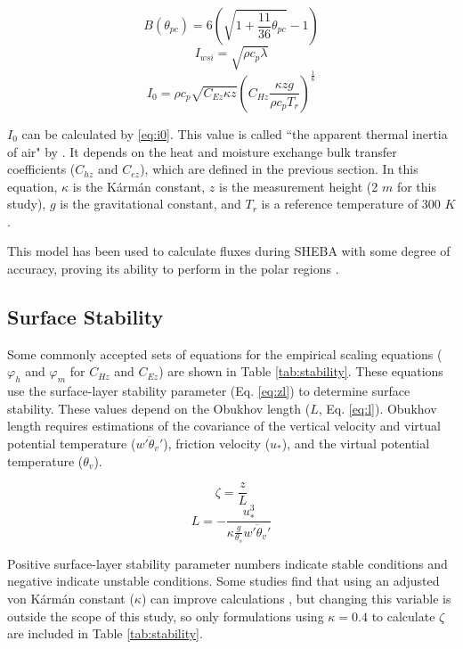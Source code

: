 \begin{equation}\label{eq:mep:b}
B(\theta_{pc}) = 6 \left( \sqrt{1 + \frac{11}{36} \theta_{pc}} - 1 \right)
\end{equation}
\begin{equation}\label{eq:iwsi}
I_{wsi} = \sqrt{\rho c_{p} \lambda}
\end{equation}
\begin{equation}\label{eq:i0}
I_{0} = \rho c_{p} \sqrt{C_{Ez}\kappa z} \left( C_{Hz} \frac{\kappa zg}{\rho c_{p} T_{r}} \right)^{\frac{1}{6}}
\end{equation}

$I_{0}$ can be calculated by \ref{eq:i0}. This value is called ``the apparent thermal inertia of air" by \citet{wang:2009}. It depends on the heat and moisture exchange bulk transfer coefficients ($C_{hz}$ and $C_{ez}$), which are defined in the previous section. In this equation, $\kappa$ is the K\'{a}rm\'{a}n constant, $z$ is the measurement height (2 $m$ for this study), $g$ is the gravitational constant, and $T_{r}$ is a reference temperature of 300 $K$. 

This model has been used to calculate fluxes during SHEBA with some degree of accuracy, proving its ability to perform in the polar regions \citep{wang:2014}.

\subsection{Surface Stability}\label{surface:stability}
Some commonly accepted sets of equations for the empirical scaling equations ($\varphi_{h}$ and $\varphi_{m}$ for $C_{Hz}$ and $C_{Ez}$) are shown in Table \ref{tab:stability}. These equations use the surface-layer stability parameter (Eq. \ref{eq:zl}) to determine surface stability. These values depend on the Obukhov length ($L$, Eq. \ref{eq:l}). Obukhov length requires estimations of the covariance of the vertical velocity and virtual potential temperature ($\overline{w'\theta_{v}'}$), friction velocity ($u_{*}$), and the virtual potential temperature ($\theta_{v}$). 

\begin{equation}\label{eq:zl}
\zeta = \frac{z}{L}
\end{equation}
\begin{equation}\label{eq:l}
L = -\frac{u_{*}^{3}}{\kappa \frac{g}{\theta_{s}} \overline{w'\theta_{v}'}}
\end{equation} 

Positive surface-layer stability parameter numbers indicate stable conditions and negative indicate unstable conditions. Some studies find that using an adjusted von K\'{a}rm\'{a}n constant ($\kappa$) can improve calculations \citep{businger:1971, zilitinkevitsch:1968, dyer:1970, foken:2008}, but changing this variable is outside the scope of this study, so only formulations using $\kappa = 0.4$ to calculate $\zeta$ are included in Table \ref{tab:stability}. 

